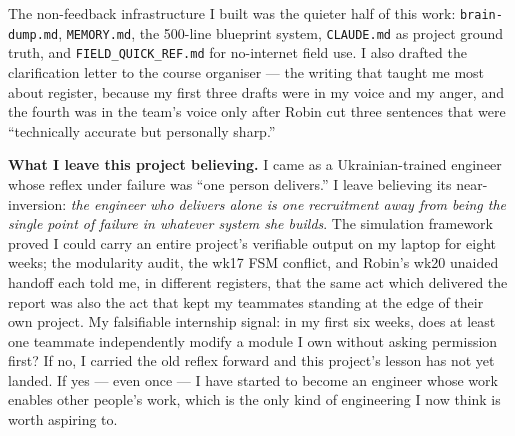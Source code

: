 The non-feedback infrastructure I built was the quieter half of this work: \texttt{brain-dump.md}, \texttt{MEMORY.md}, the 500-line blueprint system, \texttt{CLAUDE.md} as project ground truth, and \texttt{FIELD\_QUICK\_REF.md} for no-internet field use. I also drafted the clarification letter to the course organiser --- the writing that taught me most about register, because my first three drafts were in my voice and my anger, and the fourth was in the team's voice only after Robin cut three sentences that were ``technically accurate but personally sharp.''

\textbf{What I leave this project believing.} I came as a Ukrainian-trained engineer whose reflex under failure was ``one person delivers.'' I leave believing its near-inversion: \emph{the engineer who delivers alone is one recruitment away from being the single point of failure in whatever system she builds}. The simulation framework proved I could carry an entire project's verifiable output on my laptop for eight weeks; the modularity audit, the wk17 FSM conflict, and Robin's wk20 unaided handoff each told me, in different registers, that the same act which delivered the report was also the act that kept my teammates standing at the edge of their own project. My falsifiable internship signal: in my first six weeks, does at least one teammate independently modify a module I own without asking permission first? If no, I carried the old reflex forward and this project's lesson has not yet landed. If yes --- even once --- I have started to become an engineer whose work enables other people's work, which is the only kind of engineering I now think is worth aspiring to.
